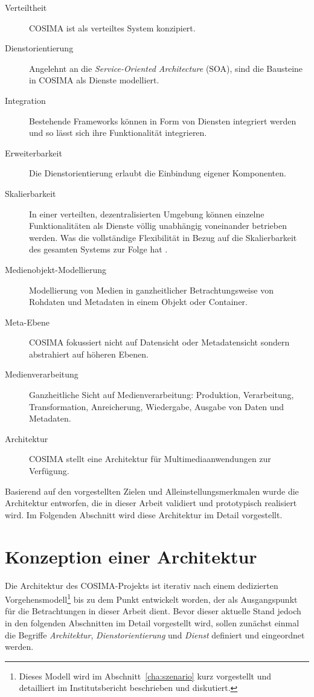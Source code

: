   \begin{description}
    \item[Verteiltheit] COSIMA ist als verteiltes System konzipiert.
    \item[Dienstorientierung] Angelehnt an die \emph{Service-Oriented Architecture} (SOA), sind die Bausteine in COSIMA als Dienste modelliert.
    \item[Integration] Bestehende Frameworks können in Form von Diensten integriert werden und so lässt sich ihre Funktionalität integrieren.
    \item[Erweiterbarkeit] Die Dienstorientierung erlaubt die Einbindung eigener Komponenten.
    \item[Skalierbarkeit] In einer verteilten, dezentralisierten Umgebung können einzelne Funktionalitäten als Dienste völlig unabhängig voneinander betrieben werden. Was die vollständige Flexibilität in Bezug auf die Skalierbarkeit des gesamten Systems zur Folge hat \citep[S. 294]{web_services_principles_and_technology}.
    \item[Medienobjekt-Modellierung] Modellierung von Medien in ganzheitlicher Betrachtungsweise von Rohdaten und Metadaten in einem Objekt oder Container.
    \item[Meta-Ebene] COSIMA fokussiert nicht auf Datensicht oder Metadatensicht sondern abstrahiert auf höheren Ebenen.
    \item[Medienverarbeitung] Ganzheitliche Sicht auf Medienverarbeitung: Produktion, Verarbeitung, Transformation, Anreicherung, Wiedergabe, Ausgabe von Daten und Metadaten.
    \item[Architektur] COSIMA stellt eine Architektur für Multimediaanwendungen zur Verfügung.
  \end{description}
  
  Basierend auf den vorgestellten Zielen und Alleinstellungsmerkmalen wurde die Architektur entworfen, die in dieser Arbeit validiert und prototypisch realisiert wird. Im Folgenden Abschnitt wird diese Architektur im Detail vorgestellt.


\section{Konzeption einer Architektur} %
\label{sec:architektur}

  Die Architektur des COSIMA-Projekts ist iterativ nach einem dedizierten Vorgehensmodell\footnote{Dieses Modell wird im Abschnitt~\ref{cha:szenario} kurz vorgestellt und detailliert im Institutsbericht \citep[S. 7ff]{bericht} beschrieben und diskutiert.} bis zu dem Punkt entwickelt worden, der als Ausgangspunkt für die Betrachtungen in dieser Arbeit dient. Bevor dieser aktuelle Stand jedoch in den folgenden Abschnitten im Detail vorgestellt wird, sollen zunächst einmal die Begriffe \emph{Architektur}, \emph{Dienstorientierung} und \emph{Dienst} definiert und eingeordnet werden.
  
